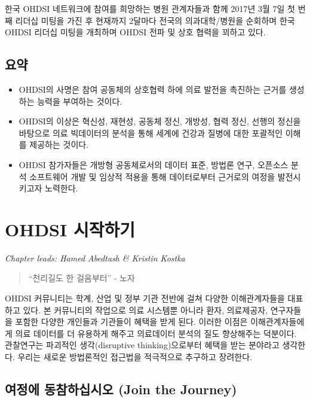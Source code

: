 \documentclass[11pt]{book}
\theoremstyle{definition}
\theoremstyle{definition}
\theoremstyle{definition}
\theoremstyle{remark}
\let\BeginKnitrBlock\begin \let\EndKnitrBlock\end
\begin{document}
한국 OHDSI 네트워크에 참여를 희망하는 병원 관계자들과 함께 2017년 3월
7일 첫 번째 리더십 미팅을 가진 후 현재까지 2달마다 전국의
의과대학/병원을 순회하며 한국 OHDSI 리더십 미팅을 개최하며 OHDSI 전파 및
상호 협력을 꾀하고 있다.

\section{요약}

\BeginKnitrBlock{rmdsummary}
\begin{itemize}
\item
  OHDSI의 사명은 참여 공동체의 상호협력 하에 의료 발전을 촉진하는 근거를
  생성하는 능력을 부여하는 것이다.
\item
  OHDSI의 이상은 혁신성, 재현성, 공동체 정신, 개방성, 협력 정신, 선행의
  정신을 바탕으로 의료 빅데이터의 분석을 통해 세계에 건강과 질병에 대한
  포괄적인 이해를 제공하는 것이다.
\item
  OHDSI 참가자들은 개방형 공동체로서의 데이터 표준, 방법론 연구,
  오픈소스 분석 소프트웨어 개발 및 임상적 적용을 통해 데이터로부터
  근거로의 여정을 발전시키고자 노력한다.
\end{itemize}
\EndKnitrBlock{rmdsummary}

\chapter{OHDSI 시작하기}\label{WhereToBegin}

\emph{Chapter leads: Hamed Abedtash \& Kristin Kostka}

\begin{quote}
``천리길도 한 걸음부터'' - 노자
\end{quote}

OHDSI 커뮤니티는 학계, 산업 및 정부 기관 전반에 걸쳐 다양한
이해관계자들을 대표하고 있다. 본 커뮤니티의 작업으로 의료 시스템뿐
아니라 환자, 의료제공자, 연구자들을 포함한 다양한 개인들과 기관들이
혜택을 받게 된다. 이러한 이점은 이해관계자들에게 의료 데이터를 더
유용하게 해주고 의료데이터 분석의 질도 향상해주는 덕분이다. 관찰연구는
파괴적인 생각(disruptive thinking)으로부터 혜택을 받는 분야라고
생각한다. 우리는 새로운 방법론적인 접근법을 적극적으로 추구하고
장려한다. 

\section{여정에 동참하십시오 (Join the
Journey)}\label{--join-the-journey}
\end{document}
